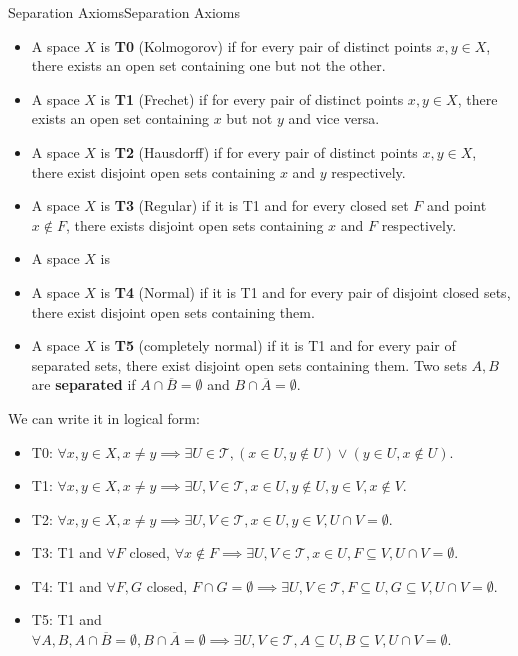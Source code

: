 \documentclass[../main.tex]{subfiles}
\begin{document}
\begin{definition}{Separation Axioms}{Separation Axioms}
	\begin{itemize}
		\item A space $X$ is \textbf{T0} (Kolmogorov) if for every pair of distinct points $x,y\in X$, there exists an open set containing one but not the other.
		\item A space $X$ is \textbf{T1} (Frechet) if for every pair of distinct points $x,y\in X$, there exists an open set containing $x$ but not $y$ and vice versa.
		\item A space $X$ is \textbf{T2} (Hausdorff) if for every pair of distinct points $x,y\in X$, there exist disjoint open sets containing $x$ and $y$ respectively.
		\item A space $X$ is \textbf{T3} (Regular) if it is T1 and for every closed set $F$ and point $x\notin F$, there exists disjoint open sets containing $x$ and $F$ respectively.
		\item A space $X$ is 
		\item A space $X$ is \textbf{T4} (Normal) if it is T1 and for every pair of disjoint closed sets, there exist disjoint open sets containing them.
		\item A space $X$ is \textbf{T5} (completely normal) if it is T1 and for every pair of separated sets, there exist disjoint open sets containing them. Two sets $A,B$ are \textbf{separated} if $A\cap \overline{B} = \emptyset$ and $B\cap \overline{A} = \emptyset$.
	\end{itemize}
	We can write it in logical form:
	\begin{itemize}
		\item T0: $\forall x,y\in X, x\neq y \implies \exists U\in \mathcal{T}, (x\in U, y\notin U) \lor (y\in U, x\notin U)$.
		\item T1: $\forall x,y\in X, x\neq y \implies \exists U,V\in \mathcal{T}, x\in U, y\notin U, y\in V, x\notin V$.
		\item T2: $\forall x,y\in X, x\neq y \implies \exists U,V\in \mathcal{T}, x\in U, y\in V, U\cap V = \emptyset$.
		\item T3: T1 and $\forall F$ closed, $\forall x\notin F \implies \exists U,V\in \mathcal{T}, x\in U, F\subseteq V, U\cap V = \emptyset$.
		\item T4: T1 and $\forall F,G$ closed, $F\cap G = \emptyset \implies \exists U,V\in \mathcal{T}, F\subseteq U, G\subseteq V, U\cap V = \emptyset$.
		\item T5: T1 and $\forall A,B,A\cap \overline{B} = \emptyset, B\cap \overline{A} = \emptyset \implies \exists U,V\in \mathcal{T}, A\subseteq U, B\subseteq V, U\cap V = \emptyset$.
	\end{itemize}
\end{definition}
\end{document}
